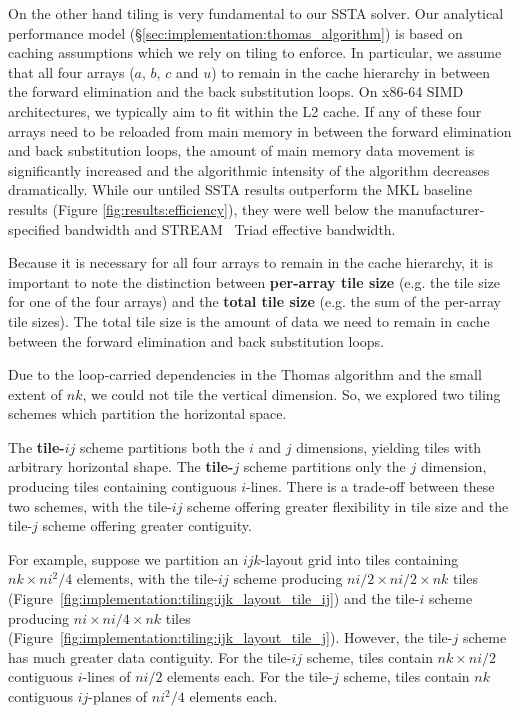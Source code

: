 \documentclass{sig-alternate-05-2015}
\begin{document}
On the other hand tiling is very fundamental to our SSTA solver.
Our analytical performance model (\S\ref{sec:implementation:thomas_algorithm})
  is based on caching assumptions which we rely on tiling to enforce.
In particular, we assume that all four arrays (\(a\), \(b\), \(c\) and \(u\))
  to remain in the cache hierarchy in between the forward elimination and the
  back substitution loops.
On x86-64 SIMD architectures, we typically aim to fit within the L2 cache.
If any of these four arrays need to be reloaded from main memory in between the
  forward elimination and back substitution loops, the amount of main memory data
  movement is significantly increased and the algorithmic intensity of the
  algorithm decreases dramatically.
While our untiled SSTA results outperform the MKL baseline results (Figure
  \ref{fig:results:efficiency}), they were well below the manufacturer-specified
  bandwidth and STREAM~\cite{stream} Triad effective bandwidth.

Because it is necessary for all four arrays to remain in the cache hierarchy, 
  it is important to note the distinction between \textbf{per-array tile size}
  (e.g. the tile size for one of the four arrays) and the
  \textbf{total tile size} (e.g. the sum of the per-array tile sizes).
The total tile size is the amount of data we need to remain in cache between
  the forward elimination and back substitution loops.

Due to the loop-carried dependencies in the Thomas algorithm and the small
  extent of \(nk\), we could not tile the vertical dimension. So, we explored two
  tiling schemes which partition the horizontal space.

The \textbf{tile-\(ij\)} scheme partitions both the \(i\) and \(j\) dimensions,
  yielding tiles with arbitrary horizontal shape. 
The \textbf{tile-\(j\)} scheme partitions only the \(j\) dimension, producing
  tiles containing contiguous \(i\)-lines.
There is a trade-off between these two schemes, with the tile-\(ij\) scheme
  offering greater flexibility in tile size and the tile-\(j\) scheme offering
  greater contiguity. 

For example, suppose we partition an \(ijk\)-layout grid into tiles containing
  \(nk \times ni^2/4\) elements, with the tile-\(ij\) scheme producing
  \(ni/2 \times ni/2 \times nk\) tiles
  (Figure~\ref{fig:implementation:tiling:ijk_layout_tile_ij})
  and the tile-\(i\) scheme producing
  \(ni \times ni/4 \times nk\) tiles
  (Figure~\ref{fig:implementation:tiling:ijk_layout_tile_j}).
However, the tile-\(j\) scheme has much greater data contiguity.
For the tile-\(ij\) scheme, tiles contain \(nk \times ni/2\) contiguous
  \(i\)-lines of \(ni/2\) elements each.
For the tile-\(j\) scheme, tiles contain \(nk\) contiguous \(ij\)-planes of
  \(ni^2/4\) elements each.
\end{document}
